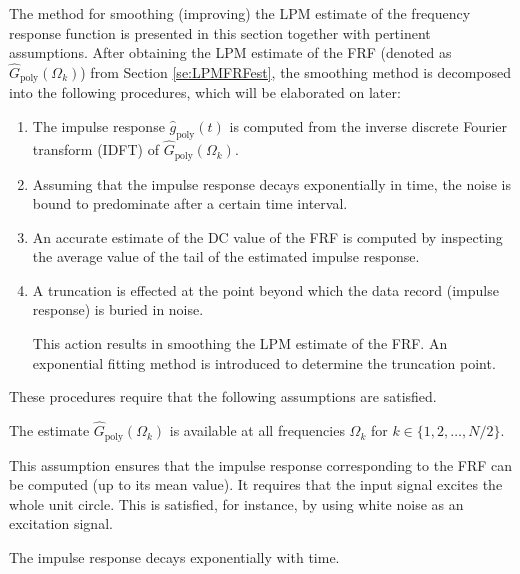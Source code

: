 The method for smoothing (improving) the LPM estimate of the frequency response function  is presented in this section together with pertinent assumptions. After obtaining the LPM estimate of the FRF (denoted as $\hat{G}_{\mathrm{poly}}(\Omega_k)$) from Section \ref{se:LPMFRFest}, the smoothing method is decomposed into the following procedures, which will be elaborated on later:
\begin{enumerate}
\item The impulse response $\hat g_\mathrm{poly}(t)$  is computed from the inverse discrete Fourier transform (IDFT) of $\hat{G}_{\mathrm{poly}}(\Omega_k)$.

\item
Assuming that the impulse response decays exponentially in time, the noise is bound to predominate after a certain time interval. 

\item
An accurate estimate of the DC value of the FRF is computed by inspecting the average value of the tail of the estimated impulse response.

\item
A truncation is effected at the point beyond which the data record (impulse response) is buried in noise. %

This action results in smoothing the LPM estimate of the FRF. An exponential fitting method is introduced to determine the truncation point.
\end{enumerate}






These procedures require that the following assumptions are satisfied.

\begin{assumption}
The estimate $\hat G_\mathrm{poly}(\Omega_k)$ is available at all frequencies $\Omega_k$ for $k\in\{1,2,\dots,N/2\}$.
\end{assumption}

This assumption ensures that the impulse response corresponding to the FRF can be computed (up to its mean value). It requires that the input signal excites the whole unit circle. This is satisfied, for instance, by using white noise as an excitation signal.


\begin{assumption}\label{ass:imprespdecay}
The impulse response decays exponentially with time.
\end{assumption}

